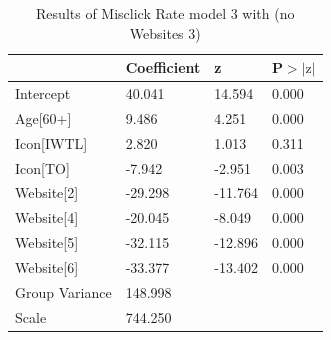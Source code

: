 \documentclass[12pt,twoside]{reedthesis}
\begin{document}
\begin{table}[h!]
        \centering
        \begin{tabular}{| p{5cm} | p{2.5cm} | p{2.5cm} | p{2.5cm} |}
            \hline
            & Coefficient & z & P$>|\text{z}|$\\
            \hline
            Intercept & 40.041 & 14.594 & 0.000\\
            \hline
            Age[60+] & 9.486 & 4.251 & 0.000\\
            \hline
            Icon[IWTL] & 2.820 & 1.013 & 0.311\\
            \hline
            Icon[TO] & -7.942 & -2.951 & 0.003\\
            \hline
            Website[2] & -29.298 & -11.764 & 0.000\\
            \hline
            Website[4] & -20.045 & -8.049 & 0.000\\
            \hline
            Website[5] & -32.115 & -12.896 & 0.000\\
            \hline
            Website[6] & -33.377 & -13.402 & 0.000\\
            \hline
            Group Variance & 148.998 &&\\
            \hline
            Scale & 744.250 &&\\
            \hline
        \end{tabular}
        \caption{Results of Misclick Rate model 3 with (no Websites 3)}
    \end{table}


  \backmatter %

    \nocite{*}


%  
 

\end{document}
